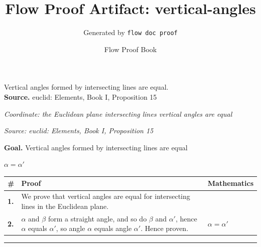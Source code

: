 \documentclass[11pt]{article}
\title{Flow Proof Artifact: vertical-angles}
\author{Generated by \texttt{flow doc proof}}
\date{Flow Proof Book}
\theoremstyle{definition}
\begin{document}
\maketitle
Vertical angles formed by intersecting lines are equal.\\[0.5em]
\textbf{Source.} euclid: Elements, Book I, Proposition 15\\[0.5em]
\bigskip
{}\par
\smallskip\noindent\textit{Coordinate: the Euclidean plane \cdot intersecting lines \cdot vertical angles are equal}\par
\smallskip\noindent\textit{Source: euclid: Elements, Book I, Proposition 15}\par
\medskip
\noindent\textbf{Goal.} Vertical angles formed by intersecting lines are equal\par
\noindent$\displaystyle \alpha = \alpha'$\par
\medskip
\noindent
\begin{tabular}{@{} >{\raggedright\arraybackslash}p{} >{\raggedright\arraybackslash}p{} >{\raggedleft\arraybackslash}p{} @{}}
\textbf{\#} & \textbf{Proof} & \textbf{Mathematics} \\
\midrule
\textbf{1.} & We prove that vertical angles are equal for intersecting lines in the Euclidean plane. & \\[0.45em]
\textbf{2.} & $\alpha$ and $\beta$ form a straight angle, and so do $\beta$ and $\alpha$$'$, hence $\alpha$ equals $\alpha$$'$, so angle $\alpha$ equals angle $\alpha$$'$. Hence proven. & $\displaystyle \alpha = \alpha'$ \\[0.45em]
\bottomrule
\end{tabular}
\label{thm:Geometry-intersecting lines-vertical_angles_are_equal}
\par\medskip\hrule
\end{document}
